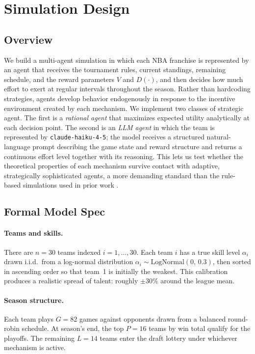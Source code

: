 \documentclass{article}
\begin{document}
\section{Simulation Design}

\subsection{Overview}

We build a multi-agent simulation in which each NBA franchise is represented
by an agent that receives the tournament rules, current standings, remaining
schedule, and the reward parameters $V$ and $D(\cdot)$, and then decides how
much effort to exert at regular intervals throughout the season.
Rather than hardcoding strategies, agents develop behavior endogenously in
response to the incentive environment created by each mechanism.
We implement two classes of strategic agent.
The first is a \emph{rational agent} that maximizes expected utility
analytically at each decision point.
The second is an \emph{LLM agent} in which the team is represented by
\texttt{claude-haiku-4-5}; the model receives a structured natural-language
prompt describing the game state and reward structure and returns a continuous
effort level together with its reasoning.
This lets us test whether the theoretical properties of each mechanism survive
contact with adaptive, strategically sophisticated agents, a more demanding
standard than the rule-based simulations used in prior work
\citep{kazachkov2020, highley2026}.

\subsection{Formal Model Spec}

\paragraph{Teams and skills.}
There are $n = 30$ teams indexed $i = 1, \ldots, 30$.
Each team $i$ has a true skill level $\alpha_i$ drawn i.i.d.\ from a
log-normal distribution $\alpha_i \sim \text{LogNormal}(0,\, 0.3)$,
then sorted in ascending order so that team~1 is initially the weakest.
This calibration produces a realistic spread of talent: roughly $\pm 30\%$
around the league mean.

\paragraph{Season structure.}
Each team plays $G = 82$ games against opponents drawn from a balanced
round-robin schedule.
At season's end, the top $P = 16$ teams by win total qualify for the playoffs.
The remaining $L = 14$ teams enter the draft lottery under whichever mechanism
is active.
\end{document}
